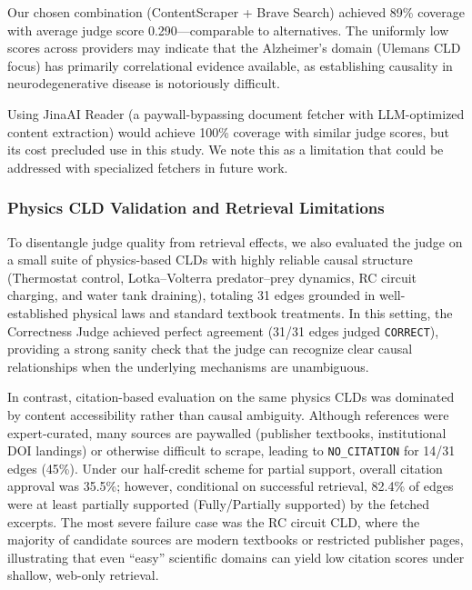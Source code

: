 Our chosen combination (ContentScraper + Brave Search) achieved 89\% coverage with average judge score 0.290---comparable to alternatives. The uniformly low scores across providers may indicate that the Alzheimer's domain (Ulemans CLD focus) has primarily correlational evidence available, as establishing causality in neurodegenerative disease is notoriously difficult.

Using JinaAI Reader (a paywall-bypassing document fetcher with LLM-optimized content extraction) would achieve 100\% coverage with similar judge scores, but its cost precluded use in this study. We note this as a limitation that could be addressed with specialized fetchers in future work.

\subsubsection{Physics CLD Validation and Retrieval Limitations}

To disentangle judge quality from retrieval effects, we also evaluated the judge on a small suite of physics-based CLDs with highly reliable causal structure (Thermostat control, Lotka--Volterra predator--prey dynamics, RC circuit charging, and water tank draining), totaling 31 edges grounded in well-established physical laws and standard textbook treatments. In this setting, the Correctness Judge achieved perfect agreement (31/31 edges judged \texttt{CORRECT}), providing a strong sanity check that the judge can recognize clear causal relationships when the underlying mechanisms are unambiguous.

In contrast, citation-based evaluation on the same physics CLDs was dominated by content accessibility rather than causal ambiguity. Although references were expert-curated, many sources are paywalled (publisher textbooks, institutional DOI landings) or otherwise difficult to scrape, leading to \texttt{NO\_CITATION} for 14/31 edges (45\%). Under our half-credit scheme for partial support, overall citation approval was 35.5\%; however, conditional on successful retrieval, 82.4\% of edges were at least partially supported (Fully/Partially supported) by the fetched excerpts. The most severe failure case was the RC circuit CLD, where the majority of candidate sources are modern textbooks or restricted publisher pages, illustrating that even ``easy'' scientific domains can yield low citation scores under shallow, web-only retrieval.

